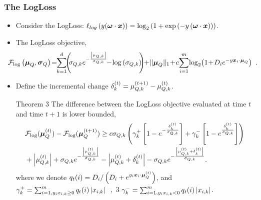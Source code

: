 \documentclass[mathserif]{beamer}
\begin{document}
\begin{frame}
\frametitle{ The LogLoss  }
\begin{itemize}
\item Consider the LogLoss: $\ell_{log}\left({y ({\boldsymbol{\omega}} \cdot {\boldsymbol{x}})}\right) = \log_2{\left({
    1+\exp{\left({-y \left({ {\boldsymbol{\omega}}\cdot {\boldsymbol{x}}}\right) }\right) } }\right)}$.
\item The LogLoss objective,
\begin{align*}
\!\!\!\!\!\!\!\F_{\log} &\paren{\vmuq,\vsigmaq}\!=\!\!
\sum_{k=1}^{d}\!\! \paren{\!\!\sigmaqi{k}e^{-\frac{\abs{\muqi{k}}}{\sigmaqi{k}}}\!\!-\!\log{ \paren{
      \sigmaqi{k} } } \!\!}\!\!+\!\Vert \vmuq
\Vert_1\!+\! c\!\sum_{i =1}^m \! \log_2\!\paren{1\!+\!D_i e^{- y  \vxii \cdot \vmuq}}~.
\end{align*}
\item Define the incremental change $\delta_k ^{(t)} =
\mu_{Q,k}^{(t+1)}-\mu_{Q,k}^{(t)}$.
\begin{block}{Theorem 3} 
The 
difference between
the LogLoss objective %
evaluated at time $t$ and time $t+1$ is lower bounded,
\begin{align*}
&{\mathcal{F}}_{\log}({\boldsymbol{\mu}}_Q^{(t)})
-{\mathcal{F}}_{\log}({\boldsymbol{\mu}}_Q^{(t+1)}) \geq  c\sigma_{Q,k} \left({\gamma_k^{+}\left[{1-e^{-\frac{\delta_k ^{(t)}}{\sigma_{Q,k}}}}\right]+\gamma_k^{-}\left[{1-e^{\frac{\delta_k ^{(t)}}{\sigma_{Q,k}}}}\right]}\right)  ~
 \\  &  +\left\vert{\mu_{Q,k}^{(t)} }\right\vert+\sigma_{Q,k} e^{-\frac{\left\vert{\mu_{Q,k}^{(t)}
      }\right\vert}{\sigma_{Q,k}}}-\left\vert{\mu_{Q,k}^{(t)} +\delta_k^{(t)}
  }\right\vert-\sigma_{Q,k} e^{-\frac{\left\vert{\mu_{Q,k}^{(t)} +\delta_k^{(t)}
      }\right\vert}{\sigma_{Q,k}}}.
\end{align*}
where we denote $
q_t(i) = {D_i}/\left({D_i+e^{y_{i}  {\boldsymbol{x}}_{i} \cdot {\boldsymbol{\mu}}_Q^{(t)} }}\right)
$, and 
$%
\gamma_k^{+} = \sum_{i=1,\yii x_{i,k} \geq 0}^{m} q_t(i)\abs{x_{i,k}}
~~$,~3
 $
\gamma_k^{-} = \sum_{i=1, y_{i} x_{i,k} <0}^{m} q_t(i)\left\vert{x_{i,k}}\right\vert
$.%
\label{lemma:lower_bound_roboost}
\end{block} 
\end{itemize}
\end{frame}
\end{document}
